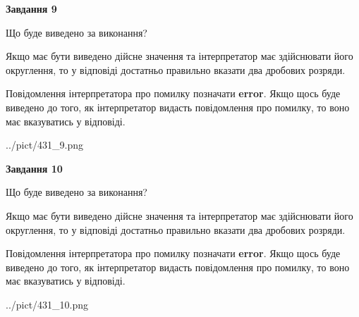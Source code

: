 \documentclass[12pt, ukrainian]{article}
\begin{document}
{\begin {Large}
{\begin {center}\textbf{Завдання 9}\end {center}}\par
Що буде виведено за виконання? \par

Якщо має бути виведено дійсне значення та інтерпретатор має здійснювати його округлення, 
то у відповіді достатньо правильно вказати два дробових розряди.

Повідомлення інтерпретатора про помилку позначати \textbf{error}.
Якщо щось буде виведено до того, як інтерпретатор видасть повідомлення про помилку, 
то воно має вказуватись у відповіді. \par

\begin{center}
	{../pict/431_9.png}
\end{center}
\newpage

{\begin {center}\textbf{Завдання 10}\end {center}}\par
Що буде виведено за виконання? \par

Якщо має бути виведено дійсне значення та інтерпретатор має здійснювати його округлення, 
то у відповіді достатньо правильно вказати два дробових розряди.

Повідомлення інтерпретатора про помилку позначати \textbf{error}.
Якщо щось буде виведено до того, як інтерпретатор видасть повідомлення про помилку, 
то воно має вказуватись у відповіді. \par

\begin{center}
	{../pict/431_10.png}
\end{center}
\newpage

\end {Large}}
\end{document}
